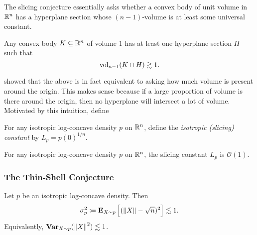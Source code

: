 		The slicing conjecture essentially asks whether a convex body of unit volume in $\mathbb{R}^n$ has a hyperplane section whose $(n-1)$-volume is at least some universal constant.

		\begin{fcon}
			Any convex body $K\subseteq\mathbb{R}^n$ of volume $1$ has at least one hyperplane section $H$ such that
			\[ \operatorname{vol}_{n-1}(K \cap H) \gtrsim 1. \]
		\end{fcon}

		\cite{slicing-conjecture-equivalent} showed that the above is in fact equivalent to asking how much volume is present around the origin. This makes sense because if a large proportion of volume is there around the origin, then no hyperplane will intersect a lot of volume.\\
		Motivated by this intuition, define

		\begin{definition}
			For any isotropic log-concave density $p$ on $\mathbb{R}^n$, define the \textit{isotropic (slicing) constant} by $L_p = p(0)^{1/n}$.
		\end{definition}

		\begin{fcon}
			\label{slicing conjecture}
			For any isotropic log-concave density $p$ on $\mathbb{R}^n$, the slicing constant $L_p$ is $\mathcal{O}(1)$.
		\end{fcon}



	\subsubsection{The Thin-Shell Conjecture}

		\begin{fcon}
			\label{con: thin shell conjecture}
			Let $p$ be an isotropic log-concave density. Then
			\[ \sigma_p^2 \coloneqq \textbf{E}_{X\sim p}\left[(\left\lVert X\right\rVert-\sqrt{n})^2\right] \lesssim 1. \]
			Equivalently, $\operatorname{\textbf{Var}}_{X\sim p}(\left\lVert X\right\rVert^2) \lesssim 1$.
		\end{fcon}

